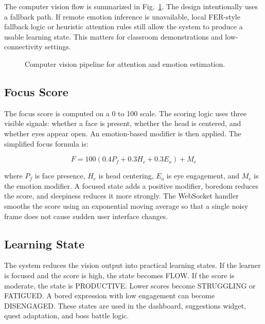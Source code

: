 \documentclass[conference]{IEEEtran}
\begin{document}
The computer vision flow is summarized in Fig.~\ref{fig:cv}. The design intentionally uses a fallback path. If remote emotion inference is unavailable, local FER-style fallback logic or heuristic attention rules still allow the system to produce a usable learning state. This matters for classroom demonstrations and low-connectivity settings.

\begin{figure}[!htbp]
  \centering
  \resizebox{\columnwidth}{!}{}
  \caption{Computer vision pipeline for attention and emotion estimation.}
  \label{fig:cv}
\end{figure}

\subsection{Focus Score}

The focus score is computed on a 0 to 100 scale. The scoring logic uses three visible signals: whether a face is present, whether the head is centered, and whether eyes appear open. An emotion-based modifier is then applied. The simplified focus formula is:

\begin{equation}
F = 100(0.4P_f + 0.3H_c + 0.3E_o) + M_e
\end{equation}

where \(P_f\) is face presence, \(H_c\) is head centering, \(E_o\) is eye engagement, and \(M_e\) is the emotion modifier. A focused state adds a positive modifier, boredom reduces the score, and sleepiness reduces it more strongly. The WebSocket handler smooths the score using an exponential moving average so that a single noisy frame does not cause sudden user interface changes.

\subsection{Learning State}

The system reduces the vision output into practical learning states. If the learner is focused and the score is high, the state becomes FLOW. If the score is moderate, the state is PRODUCTIVE. Lower scores become STRUGGLING or FATIGUED. A bored expression with low engagement can become DISENGAGED. These states are used in the dashboard, suggestions widget, quest adaptation, and boss battle logic.



\FloatBarrier
\end{document}
